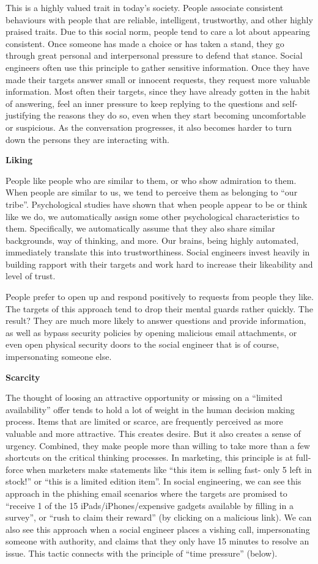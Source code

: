 This is a highly valued trait in today’s society. People associate consistent behaviours with people that are reliable, intelligent, trustworthy, and other highly praised traits. Due to this social norm, people tend to care a lot about appearing consistent. Once someone has made a choice or has taken a stand, they go through great personal and interpersonal pressure to defend that stance. Social engineers often use this principle to gather sensitive information. Once they have made their targets answer small or innocent requests, they request more valuable information. Most often their targets, since they have already gotten in the habit of answering, feel an inner pressure to keep replying to the questions and self-justifying the reasons they do so, even when they start becoming uncomfortable or suspicious. As the conversation progresses, it also becomes harder to turn down the persons they are interacting with.

\textbf{Liking}

People like people who are similar to them, or who show admiration to them. When people are similar to us, we tend to perceive them as belonging to “our tribe”. Psychological studies have shown that when people appear to be or think like we do, we automatically assign some other psychological characteristics to them. Specifically, we automatically assume that they also share similar backgrounds, way of thinking, and more. Our brains, being highly automated, immediately translate this into trustworthiness. Social engineers invest heavily in building rapport with their targets and work hard to increase their likeability and level of trust.

People prefer to open up and respond positively to requests from people they like. The targets of this approach tend to drop their mental guards rather quickly. The result? They are much more likely to answer questions and provide information, as well as bypass security policies by opening malicious email attachments, or even open physical security doors to the social engineer that is of course, impersonating someone else.

\textbf{Scarcity}

The thought of loosing an attractive opportunity or missing on a “limited availability” offer tends to hold a lot of weight in the human decision making process. Items that are limited or scarce, are frequently perceived as more valuable and more attractive. This creates desire. But it also creates a sense of urgency. Combined, they make people more than willing to take more than a few shortcuts on the critical thinking processes. In marketing, this principle is at full-force when marketers make statements like “this item is selling fast- only 5 left in stock!” or “this is a limited edition item”. In social engineering, we can see this approach in the phishing email scenarios where the targets are promised to “receive 1 of the 15 iPads/iPhones/expensive gadgets available by filling in a survey”, or “rush to claim their reward” (by clicking on a malicious link). We can also see this approach when a social engineer places a vishing call, impersonating someone with authority, and claims that they only have 15 minutes to resolve an issue. This tactic connects with the principle of “time pressure” (below).

